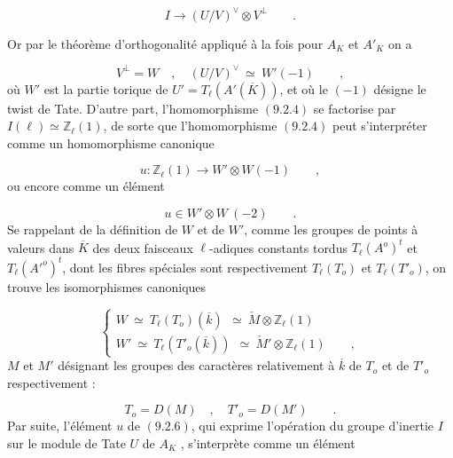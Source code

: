 \begin{equation}\tag{9.2.4}
I \longrightarrow (U/V)^{\vee} \otimes V^{\perp} \qquad .
\end{equation}


Or par le théorème d'orthogonalité appliqué à la fois pour $A_K$ et $A'_K$ on a

\begin{equation*}
V^{\perp} = W \quad ,\quad (U/V)^{\vee} \ \simeq\ W'(-1) \qquad ,
\end{equation*}
où $W'$ est la partie torique de $U'=T_{\ell}(A'(\overline{K}))$, et où le $(-1)$ désigne le twist de Tate. D'autre part, l'homomorphisme $(9.2.4)$ se factorise par $I(\ell) \simeq \mathbb{Z}_{\ell}(1)$, de sorte que l'homomorphisme $(9.2.4)$ peut s'interpréter comme un homomorphisme canonique

\begin{equation}\tag{9.2.5}
u: \mathbb{Z}_{\ell}(1) \longrightarrow W'\otimes W(-1) \qquad ,
\end{equation}
ou encore comme un élément

\begin{equation}\tag{9.2.6}
u \in W' \otimes W\ (-2) \qquad .
\end{equation}
Se rappelant de la définition de $W$ et de $W'$, comme les groupes de points à valeurs dans $\overline{K}$ des deux faisceaux $\ell$-adiques constants tordus $T_{\ell}(A^o)^t$ et $T_{\ell}({A'}^{o})^t$, dont les fibres spéciales sont respectivement $T_{\ell}(T_o)$ et $T_{\ell}(T'_o)$, on trouve les isomorphismes canoniques

\begin{equation}\tag{9.2.7}
\left\{ \begin{array}{l} W \ \simeq\ T_{\ell}(T_o)(\overline{k}) \ \ \simeq\ \check{M} \otimes \mathbb{Z}_{\ell}(1) \\[3ex] W' \ \simeq\ T_{\ell}(T'_o(\overline{k})) \ \ \simeq\ \check{M}' \otimes \mathbb{Z}_{\ell}(1) \qquad , \end{array} \right.
\end{equation}
$M$ et $M'$ désignant les groupes des caractères relativement à $\overline{k}$ de $T_o$ et de $T'_o$ respectivement :

\begin{equation}\tag{9.2.8}
T_o = D(M) \quad ,\quad T'_o = D(M') \qquad .
\end{equation}
Par suite, l'élément $u$ de $(9.2.6)$, qui  exprime l'opération du groupe d'inertie $I$ sur le module de Tate $U$ de $A_K$ , s'interprète comme un élément


